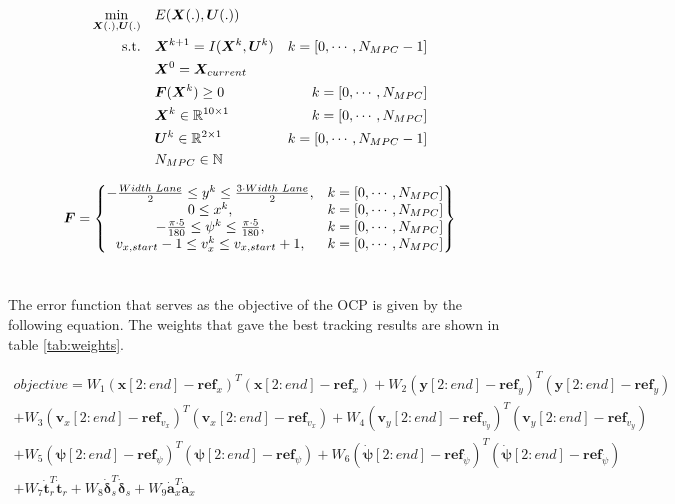 \begin{equation}\label{opt:tracking}
\begin{aligned}
\min_{\bm{X}(.),\bm{U}(.)} \quad &  E(\bm{X}(.),\bm{U}(.)) \\
\textrm{s.t.} \quad & \bm{X}^{k+1} = I(\bm{X}^{k}, \bm{U}^{k}) & k = [0,\cdots, N_{MPC}-1]\\
& \bm{X}^{0} = \bm{X}_{current} \\
& \bm{F}(\bm{X}^{k}) \geq 0	& k = [0,\cdots, N_{MPC}]\\
& \bm{X}^{k}\in \mathbb{R}^{10\times 1}  & k = [0,\cdots, N_{MPC}]\\
& \bm{U}^{k}\in \mathbb{R}^{2\times 1} \hspace{3 mm} & k = [0,\cdots, N_{MPC}-1]\\
&  N_{MPC} \in \mathbb{N}
\end{aligned}
\end{equation}

\begin{equation}\label{eq:F_MPC}
\bm{F} =
\begin{Bmatrix}
-\frac{Width\hspace{1mm}Lane}{2} \leq y^k \leq \frac{3\cdot Width\hspace{1mm}Lane}{2}, & k = [0,\cdots, N_{MPC}] \\
0 \leq x^k, & k = [0,\cdots, N_{MPC}] \\
-\frac{\pi\cdot 5}{180} \leq \psi^k \leq \frac{\pi\cdot 5}{180}, & k = [0,\cdots, N_{MPC}] \\
v_{x,start}-1 \leq v_x^k \leq v_{x,start}+1, & k = [0,\cdots, N_{MPC}]
\end{Bmatrix}
\end{equation}\

The error function that serves as the objective of the OCP is given by the following equation. The weights that gave the best tracking results are shown in table \ref{tab:weights}.

\begin{multline*} 
objective=W_1(\bm{x}[2:end]-\bm{ref}_x)^T(\bm{x}[2:end]-\bm{ref}_x)+W_2(\bm{y}[2:end]-\bm{ref}_y)^T(\bm{y}[2:end]-\bm{ref}_y)\\
+W_3(\bm{v}_x[2:end]-\bm{ref}_{v_x})^T(\bm{v}_x[2:end]-\bm{ref}_{v_x})+W_4(\bm{v}_y[2:end]-\bm{ref}_{v_y})^T(\bm{v}_y[2:end]-\bm{ref}_{v_y})\\+W_5(\bm{\psi}[2:end]-\bm{ref}_{\psi})^T(\bm{\psi}[2:end]-\bm{ref}_\psi)
+W_6(\bm{\dot{\psi}}[2:end]-\bm{ref}_{\dot{\psi}})^T(\bm{\dot{\psi}}[2:end]-\bm{ref}_{\dot{\psi}})\\ + W_7\dot{\bm{t}}_r^T\dot{\bm{t}}_r+W_8\dot{\bm{\delta}}_s^T\dot{\bm{\delta}}_s + W_9\dot{\bm{a}}_x^T\dot{\bm{a}}_x
\end{multline*}

